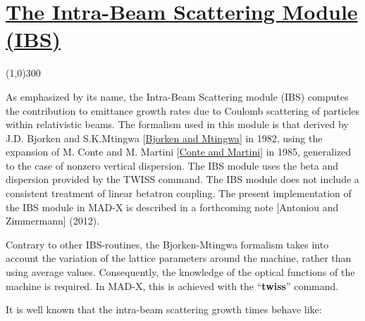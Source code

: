 







\section{\href{SECTION00000000000000000000}{ The Intra-Beam Scattering Module (IBS)}}{ 




{ 

\line(1,0){300}
}




{ }

{ As emphasized by its name, the Intra-Beam Scattering module (IBS) computes the  contribution to emittance growth rates due to Coulomb scattering of particles within relativistic beams. The formalism used in this module is that derived by J.D. Bjorken and S.K.Mtingwa [\href{../Introduction/bibliography.html#bm1}{Bjorken and Mtingwa}] in 1982, using the expansion of M. Conte and M. Martini [\href{../Introduction/bibliography.html#conte}{Conte and Martini}] in 1985,  generalized to the case of nonzero vertical dispersion.  The IBS module uses the beta and dispersion provided by the TWISS command.   The IBS module does not include a consistent treatment of linear betatron coupling.  The present implementation of the IBS module in MAD-X is described in a forthcoming note  [Antoniou and Zimmermann] (2012).  

 Contrary to other IBS-routines, the Bjorken-Mtingwa formalism takes into account the variation of the lattice parameters around the machine, rather than using average values. Consequently, the knowledge of the optical functions of the machine is required. In MAD-X, this is achieved with the ``\textbf{twiss}'' command. }

{ It is well known that the intra-beam scattering growth times behave like: }
\\


%  

}
